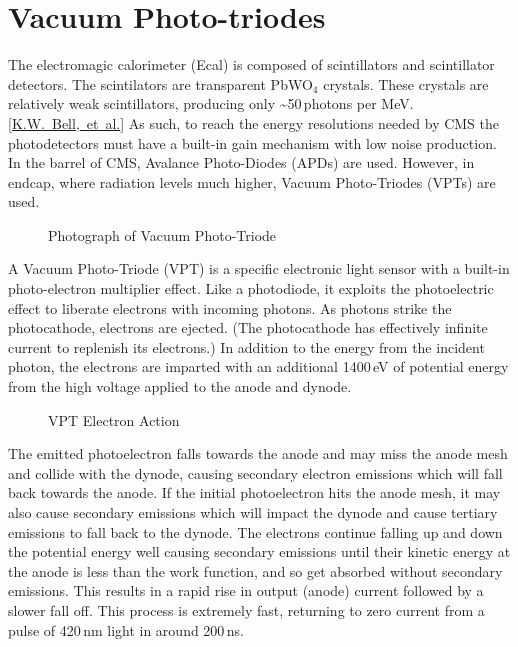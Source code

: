 
\section{Vacuum Photo-triodes}
\label{sec:eq_vpt}

The electromagic calorimeter (Ecal) is composed of scintillators and scintillator detectors.  The scintilators are transparent PbWO$_4$ crystals.  These crystals are relatively weak scintillators, producing only \~{}50\,photons per MeV. [\href{papers/1344324}{K.W.\ Bell,~et~al.}]  As such, to reach the energy resolutions needed by CMS the photodetectors must have a built-in gain mechanism with low noise production.  In the barrel of CMS, Avalance Photo-Diodes (APDs) are used.  However, in endcap, where radiation levels much higher, Vacuum Photo-Triodes (VPTs) are used.

\begin{figure}[htbp]
  \centering
  \caption{Photograph of Vacuum Photo-Triode}
  \label{fig:eq_vpt:vpt}
\end{figure}

A Vacuum Photo-Triode (VPT) is a specific electronic light sensor with a built-in photo-electron multiplier effect.  Like a photodiode, it exploits the photoelectric effect to liberate electrons with incoming photons.  As photons strike the photocathode, electrons are ejected.  (The photocathode has effectively infinite current to replenish its electrons.)  In addition to the energy from the incident photon, the electrons are imparted with an additional 1400\,eV of potential energy from the high voltage applied to the anode and dynode.  

\begin{figure}[htbp]
  \centering
  
  \caption{VPT Electron Action}
  \label{fig:eq_vpt:electron_action}
\end{figure}

The emitted photoelectron falls towards the anode and may miss the anode mesh and collide with the dynode, causing secondary electron emissions which will fall back towards the anode.  If the initial photoelectron hits the anode mesh, it may also cause secondary emissions which will impact the dynode and cause tertiary emissions to fall back to the dynode.  The electrons continue falling up and down the potential energy well causing secondary emissions until their kinetic energy at the anode is less than the work function, and so get absorbed without secondary emissions.  This results in a rapid rise in output (anode) current followed by a slower fall off.  This process is extremely fast, returning to zero current from a pulse of 420\,nm light in around 200\,ns.

